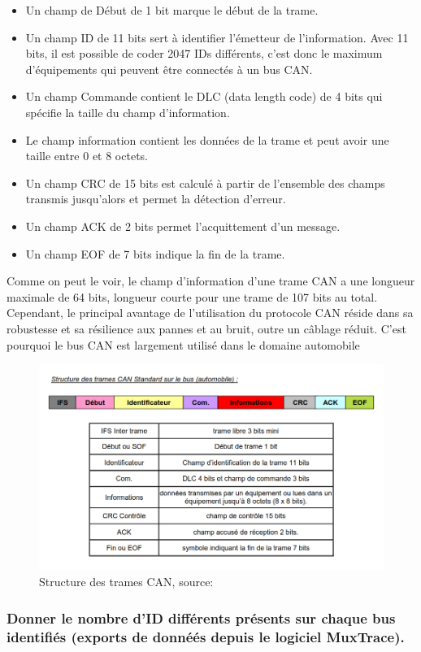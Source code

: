 \documentclass{rapportECC}
\begin{document}
\begin{itemize}
    \item Un champ de Début de 1 bit marque le début de la trame.
    \item Un champ ID de 11 bits sert à identifier l'émetteur de l'information. Avec 11 bits, il est possible de coder 2047 IDs différents, c'est donc le maximum d'équipements qui peuvent être connectés à un bus CAN.
    \item Un champ Commande contient le DLC (data length code) de 4 bits qui spécifie la taille du champ d'information.
    \item Le champ information contient les données de la trame et peut avoir une taille entre 0 et 8 octets.
    \item Un champ CRC de 15 bits est calculé à partir de l'ensemble des champs transmis jusqu'alors et permet la détection d'erreur.
    \item Un champ ACK de 2 bits permet l'acquittement d'un message.
    \item Un champ EOF de 7 bits indique la fin de la trame.
\end{itemize}


Comme on peut le voir, le champ d'information d'une trame CAN a une longueur maximale de 64 bits, longueur courte pour une trame de 107 bits au total. Cependant, le principal avantage de l'utilisation du protocole CAN réside dans sa robustesse et sa résilience aux pannes et au bruit, outre un câblage réduit. C'est pourquoi le bus CAN est largement utilisé dans le domaine automobile

\begin{figure}[H]
    \centering
    \includegraphics[width=.7\textwidth]{./images/structure_trames_CAN.png}
    \caption{Structure des trames CAN, source: \cite{exxotest}}
    \label{fig:structure_trames_CAN}
\end{figure}

\subsubsection*{Donner le nombre d'ID différents présents sur chaque bus identifiés (exports de donnéés depuis le logiciel MuxTrace).}
\end{document}
